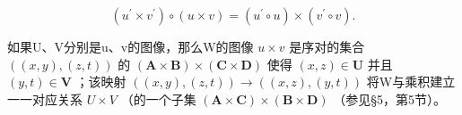 \[
\left(u ^ {\prime} \times v ^ {\prime}\right) \circ (u \times v) = \left(u ^ {\prime} \circ u\right) \times \left(v ^ {\prime} \circ v\right).
\]

如果U、V分别是u、v的图像，那么W的图像 \(u \times v\) 是序对的集合 \(((x, y), (z, t))\) 的 \((\mathbf{A} \times \mathbf{B}) \times (\mathbf{C} \times \mathbf{D})\) 使得 \((x, z) \in \mathbf{U}\) 并且 \((y, t) \in \mathbf{V}\) ；该映射 \(((x, y), (z, t)) \to ((x, z), (y, t))\) 将W与乘积建立一一对应关系 \(U \times V\) （的一个子集 \((\mathbf{A} \times \mathbf{C}) \times (\mathbf{B} \times \mathbf{D})\) （参见§5，第5节）。

